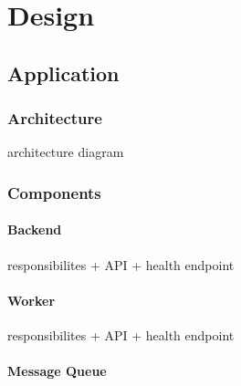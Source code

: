 \chapter{Design}

\section{Application}

\subsection{Architecture}

architecture diagram

\subsection{Components}

\subsubsection{Backend}

responsibilites + API + health endpoint

\subsubsection{Worker}

responsibilites + API + health endpoint

\subsubsection{Message Queue}

